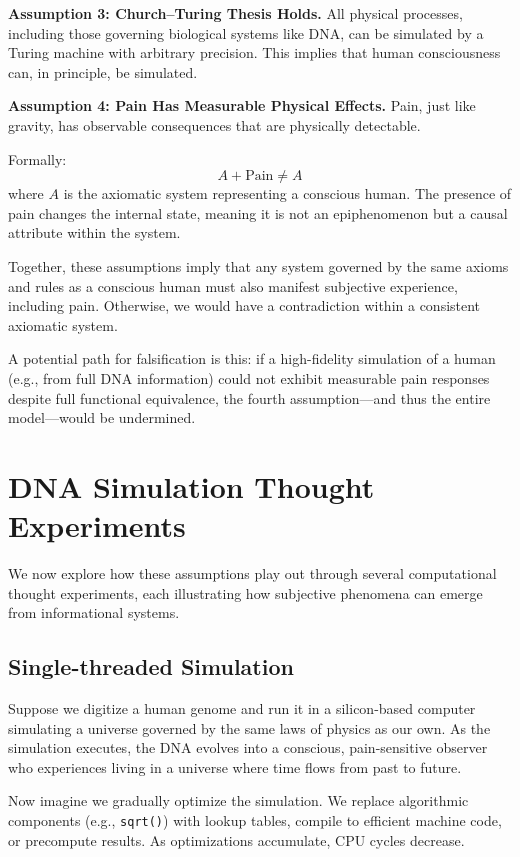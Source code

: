 \documentclass[11pt]{article}
\begin{document}
\vspace{0.5em}
\textbf{Assumption 3: Church–Turing Thesis Holds.}
All physical processes, including those governing biological systems like DNA, can be simulated by a Turing machine with arbitrary precision. This implies that human consciousness can, in principle, be simulated.

\textbf{Assumption 4: Pain Has Measurable Physical Effects.}
Pain, just like gravity, has observable consequences that are physically detectable.

Formally:
\[
  A + \text{Pain} \neq A
\]
where \( A \) is the axiomatic system representing a conscious human. The presence of pain changes the internal state, meaning it is not an epiphenomenon but a causal attribute within the system.

\vspace{0.5em}
Together, these assumptions imply that any system governed by the same axioms and rules as a conscious human must also manifest subjective experience, including pain. Otherwise, we would have a contradiction within a consistent axiomatic system.

A potential path for falsification is this: if a high-fidelity simulation of a human (e.g., from full DNA information) could not exhibit measurable pain responses despite full functional equivalence, the fourth assumption—and thus the entire model—would be undermined.

\section{DNA Simulation Thought Experiments}

We now explore how these assumptions play out through several computational thought experiments, each illustrating how subjective phenomena can emerge from informational systems.

\subsection{Single-threaded Simulation}

Suppose we digitize a human genome and run it in a silicon-based computer simulating a universe governed by the same laws of physics as our own. As the simulation executes, the DNA evolves into a conscious, pain-sensitive observer who experiences living in a universe where time flows from past to future.

Now imagine we gradually optimize the simulation. We replace algorithmic components (e.g., \texttt{sqrt()}) with lookup tables, compile to efficient machine code, or precompute results. As optimizations accumulate, CPU cycles decrease.
\end{document}
